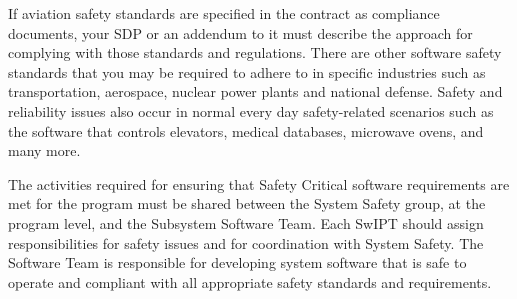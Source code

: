If aviation safety standards are specified in the contract as compliance documents, your SDP or an addendum
to it must describe the approach for complying with those
standards and regulations. There are other software safety
standards that you may be required to adhere to in specific
industries such as transportation, aerospace, nuclear power
plants and national defense. Safety and reliability issues also
occur in normal every day safety-related scenarios such as the
software that controls elevators, medical databases, microwave ovens, and many more.

The activities required for ensuring that Safety Critical
software requirements are met for the program must be shared
between the System Safety group, at the program level, and
the Subsystem Software Team. Each SwIPT should assign
responsibilities for safety issues and for coordination with
System Safety. The Software Team is responsible for developing system software that is safe to operate and compliant
with all appropriate safety standards and requirements.